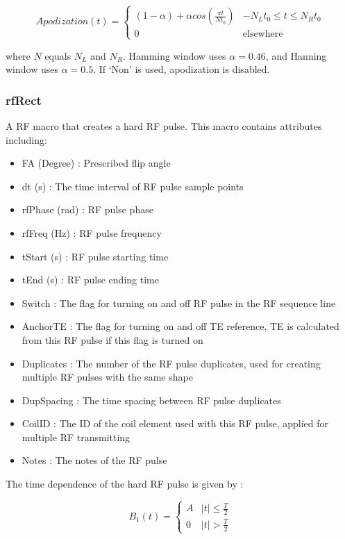 \documentclass{book}%
\begin{document}
\begin{equation}
Apodization(t) = 
\begin{cases}
 (1-\alpha) + \alpha cos(\frac{\pi t}{N t_0}) &  -N_L t_0 \leq t \leq N_R t_0 \\
 0                                          &  \text{elsewhere}
\end{cases}
\label{eq:Apodization}
\end{equation}

where $N$ equals $N_L$ and $N_R$. Hamming window uses $\alpha=0.46$, and Hanning window uses $\alpha=0.5$. If `Non' is used, apodization is disabled.

\subsubsection{rfRect}

A RF macro that creates a hard RF pulse. This macro contains attributes including:

\begin{itemize}
	\item FA (Degree) : Prescribed flip angle 
	\item dt (s) : The time interval of RF pulse sample points
	\item rfPhase (rad) : RF pulse phase
	\item rfFreq (Hz) : RF pulse frequency
	\item tStart (s) : RF pulse starting time
	\item tEnd (s) : RF pulse ending time
	\item Switch : The flag for turning on and off RF pulse in the RF sequence line
	\item AnchorTE : The flag for turning on and off TE reference, TE is calculated from this RF pulse if this flag is turned on
	\item Duplicates : The number of the RF pulse duplicates, used for creating multiple RF pulses with the same shape
	\item DupSpacing : The time spacing between RF pulse duplicates
	\item CoilID : The ID of the coil element used with this RF pulse, applied for multiple RF transmitting
	\item Notes : The notes of the RF pulse 
\end{itemize}


The time dependence of the hard RF pulse is given by \cite{Handbook2004}:

\begin{equation}
B_1(t) = 
\begin{cases}
 A  &  |t| \leq \frac{T}{2} \\
 0  &  |t| > \frac{T}{2}
\end{cases}
\label{eq:Rect}
\end{equation}
\end{document}
